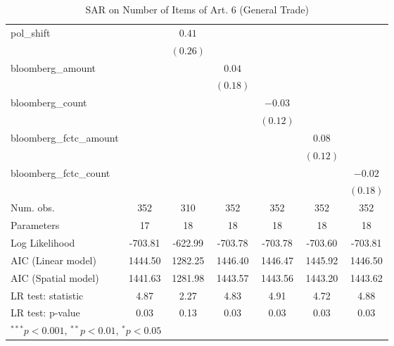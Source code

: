 \begin{table}[!h]
\begin{center}
\begin{tabular}{l c c c c c c }
pol\_shift              &              & $0.41$       &              &              &              &              \\
                        &              & $(0.26)$     &              &              &              &              \\
bloomberg\_amount       &              &              & $0.04$       &              &              &              \\
                        &              &              & $(0.18)$     &              &              &              \\
bloomberg\_count        &              &              &              & $-0.03$      &              &              \\
                        &              &              &              & $(0.12)$     &              &              \\
bloomberg\_fctc\_amount &              &              &              &              & $0.08$       &              \\
                        &              &              &              &              & $(0.12)$     &              \\
bloomberg\_fctc\_count  &              &              &              &              &              & $-0.02$      \\
                        &              &              &              &              &              & $(0.18)$     \\
\midrule
Num. obs.               & 352          & 310          & 352          & 352          & 352          & 352          \\
Parameters              & 17           & 18           & 18           & 18           & 18           & 18           \\
Log Likelihood          & -703.81      & -622.99      & -703.78      & -703.78      & -703.60      & -703.81      \\
AIC (Linear model)      & 1444.50      & 1282.25      & 1446.40      & 1446.47      & 1445.92      & 1446.50      \\
AIC (Spatial model)     & 1441.63      & 1281.98      & 1443.57      & 1443.56      & 1443.20      & 1443.62      \\
LR test: statistic      & 4.87         & 2.27         & 4.83         & 4.91         & 4.72         & 4.88         \\
LR test: p-value        & 0.03         & 0.13         & 0.03         & 0.03         & 0.03         & 0.03         \\
\bottomrule
\multicolumn{7}{l}{\scriptsize{$^{***}p<0.001$, $^{**}p<0.01$, $^*p<0.05$}}
\end{tabular}
\caption{SAR on Number of Items of Art. 6 (General Trade)}
\label{table:coefficients}
\end{center}
\end{table}
